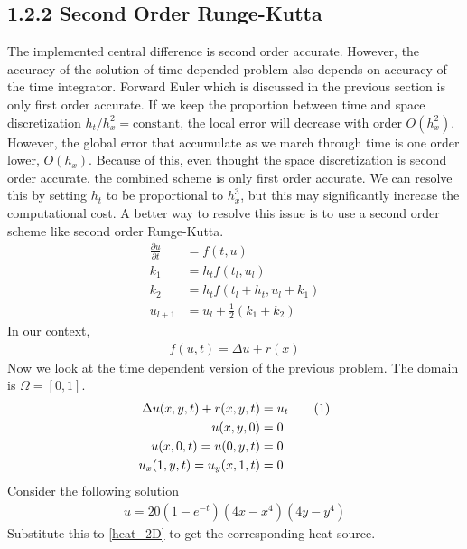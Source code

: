 \documentclass[11pt, letterpaper, hidelinks]{article}
\theoremstyle{definition}
\newcommand\numberthis{\addtocounter{equation}{1}\tag{\theequation}}
\begin{document}
\subsection{1.2.2 Second Order Runge-Kutta}
The implemented central difference is second order accurate. However, the accuracy of the solution of time depended problem also depends on accuracy of the time integrator. Forward Euler which is discussed in the previous section is only first order accurate. If we keep the proportion between time and space discretization $h_t/h_x^2=\text{constant}$, the local error will decrease with order $O(h_x^2)$. However, the global error that accumulate as we march through time is one order lower, $O(h_x)$. Because of this, even thought the space discretization is second order accurate, the combined scheme is only first order accurate. We can resolve this by setting $h_t$ to be proportional to $h_x^3$, but this may significantly increase the computational cost. A better way to resolve this issue is to use a second order scheme like second order Runge-Kutta.
\begin{align*}
    \frac{\partial u}{\partial t} & = f(t,u)                                 \\
    k_1                           & = h_t f(t_l,u_l)                         \\
    k_2                           & = h_t f(t_l+h_t,u_l+k_1)                 \\
    u_{l+1}                       & = u_l + \frac{1}{2} \left(k_1+k_2\right)
\end{align*}
In our context,
\begin{align*}
    f(u,t) = \Delta u + r(x)
\end{align*}
Now we look at the time dependent version of the previous problem. The domain is $\Omega=[0,1]$.
\begin{align*}
    \Delta u(x,y,t) + r(x,y,t) & = u_t  \numberthis \label{heat_2D} \\
    u(x,y,0)                   & = 0                                \\
    u(x,0,t)=u(0,y,t)          & = 0                                \\
    u_x(1,y,t)=u_y(x,1,t)      & = 0
\end{align*}
Consider the following solution
\begin{align*}
    u = 20\left(1-e^{-t}\right) (4x-x^4) (4y-y^4)
\end{align*}
Substitute this to \eqref{heat_2D} to get the corresponding heat source.
\end{document}
